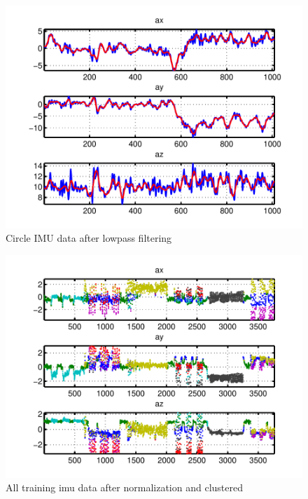 \documentclass[twoside]{article}
\begin{document}
\begin{multicols}{2}
\begin{figure}[H]
\centering
\includegraphics[width=\columnwidth]{fig/filter.pdf} 
\caption{Circle IMU data after lowpass filtering}
\label{fig:imu_filt}
\end{figure}


\begin{figure}[H]
\centering
\includegraphics[width=\columnwidth]{fig/cluster.pdf} 
\caption{All training imu data after normalization and clustered}
\label{fig:imu_cluster}
\end{figure}



\end{multicols}
\end{document}
